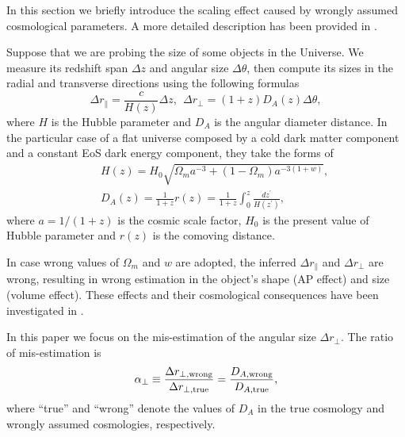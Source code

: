 \documentclass[iop]{emulateapj}
\begin{document}
In this section we briefly introduce the scaling effect caused by wrongly assumed cosmological parameters.
A more detailed description has been provided in \cite{Li2014,Li2015,Li2016}.

Suppose that we are probing the size of some objects in the Universe.
We measure its redshift span $\Delta z$ and angular size $\Delta \theta$,
then compute its sizes in the radial and transverse directions using the following formulas
\begin{equation}\label{eq:distance}
\Delta r_{\parallel} = \frac{c}{H(z)}\Delta z,\ \ \Delta r_{\bot}=(1+z)D_A(z)\Delta \theta,
\end{equation}
where $H$ is the Hubble parameter and $D_A$ is the angular diameter distance.
In the particular case of a flat universe composed by a cold dark matter component and a constant EoS dark energy component, they take the forms of
\begin{eqnarray}\label{eq:HDA}
& &H(z) = H_0\sqrt{\Omega_ma^{-3}+(1-\Omega_m)a^{-3(1+w)}},\nonumber\\
& &D_A(z) = \frac{1}{1+z}r(z)=\frac{1}{1+z}\int_0^z \frac{dz^\prime}{H(z^\prime)},
\end{eqnarray}
where $a=1/(1+z)$ is the cosmic scale factor,
$H_0$ is the present value of Hubble parameter and $r(z)$ is the comoving distance.

In case wrong values of $\Omega_m$ and $w$ are adopted, 
the inferred $\Delta r_{\parallel}$ and $\Delta r_{\bot}$ are wrong,
resulting in wrong estimation in the object's shape (AP effect) and size (volume effect).
These effects and their cosmological consequences have been investigated in \cite{Li2014,Li2015,Li2016}.

In this paper we focus on the mis-estimation of the angular size $\Delta r_{\bot}$. %
The ratio of mis-estimation is
\begin{equation}\label{eq:DA}
 \alpha_{\bot} \equiv \frac{\Delta r_{\bot, \rm wrong}}{\Delta r_{\bot, \rm true}}
 = \frac{D_{A, \rm wrong}}{D_{A, \rm true}},
\end{equation}
where ``true'' and ``wrong'' denote the values of $D_A$ in the true cosmology and wrongly assumed cosmologies, respectively.
\end{document}
